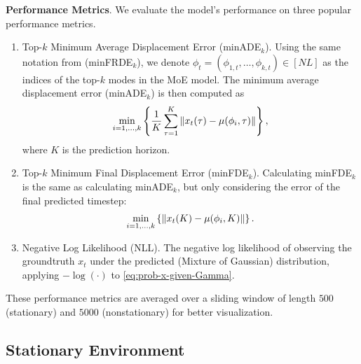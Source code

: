 {\bf Performance Metrics}. 
We evaluate the model's performance on three popular performance metrics.

\begin{enumerate}
    \item Top-$k$ Minimum Average Displacement Error (minADE$_k$). Using the same notation from (minFRDE$_k$), we denote $\phi_t=(\phi_{1,t},\dots,\phi_{k,t}) \in [NL]$ as the indices of the top-$k$ modes in the MoE model. 
The minimum average displacement error (minADE$_k$) is then computed as
\begin{align*}
    \min_{i = 1, \dots, k} \left\{ \frac{1}{K} \sum_{\tau=1}^{K} \left\| x_t(\tau)  - \mu(\phi_i, \tau) \right\| \right\}, 
\end{align*} where $K$ is the prediction horizon.

    \item Top-$k$ Minimum Final Displacement Error (minFDE$_k$). Calculating minFDE$_k$ is the same as calculating minADE$_k$, but only considering the error of the final predicted timestep:
    \begin{align*}
        \min_{i = 1, \dots, k} \left\{  \left\| x_t(K)  - \mu(\phi_i, K) \right\| \right\}. 
    \end{align*}

    \item Negative Log Likelihood (NLL). The negative log likelihood of observing the groundtruth $x_t$ under the predicted (Mixture of Gaussian) distribution, \ie applying $-\log(\cdot)$ to \eqref{eq:prob-x-given-Gamma}.


\end{enumerate}

These performance metrics are averaged over a sliding window of length $500$ (stationary) and $5000$ (nonstationary) for better visualization.
 


\subsection{Stationary Environment}






